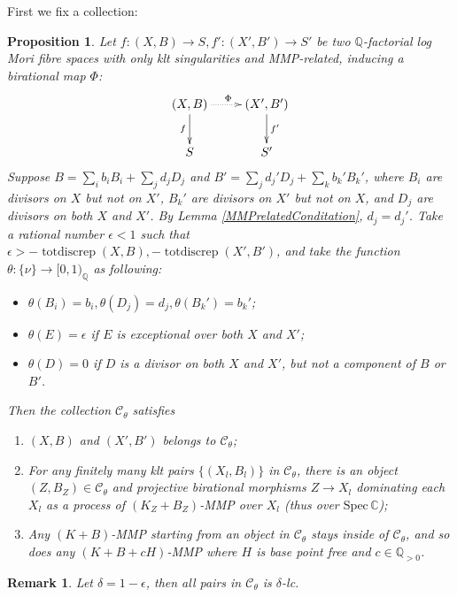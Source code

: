 \documentclass{article}
\newtheorem{prop}[defn]{Proposition}
\newtheorem{rmk}[defn]{Remark}
\begin{document}
First we fix a collection: 
\begin{prop}\label{cat}
  \cite[Lemma 3.6]{brunoLogSarkisovProgram1995}
  Let $ f:(X,B)\to S,f':(X',B')\to S' $ be two $ \mathbb{Q} $-factorial log Mori fibre spaces  with only klt singularities and MMP-related, inducing a birational map $\Phi$:
  \[ \xymatrix{
      (X,B)\ar[d]_f\ar@{.>}[r]^\Phi&(X',B')\ar[d]^{f'}\\
 S&S'} \]
 Suppose  $ B=\sum_ib_iB_i+\sum_jd_jD_j $ and $ B'=\sum_jd_j'D_j+\sum_kb_k'B_k' $, where $ B_i $ are divisors on $ X $ but not on $ X' $, $ B_k' $ are divisors on $ X' $ but not on $ X $, and $ D_j $ are divisors on both $ X $ and $ X' $. By Lemma \ref{MMPrelatedConditation}, $ d_j=d_j' $. Take a rational number $ \epsilon<1 $ such that $ \epsilon> -\operatorname{totdiscrep}(X,B),-\operatorname{totdiscrep}(X',B') $, and take the function $ \theta:\{\nu\}\to [0,1)_\mathbb{Q} $ as following:
  \begin{itemize}
    \item $ \theta(B_i)=b_i, \theta(D_j)=d_j,\theta(B_k')=b_k'$;
    \item $ \theta(E)=\epsilon $ if $ E $ is exceptional over both $ X $ and $ X' $;
    \item $ \theta(D)=0 $ if $ D $ is a divisor on both $ X $ and $ X' $, but not a component of $ B $ or $ B' $.
  \end{itemize}
  Then the collection $ \mathcal{C}_\theta $ satisfies
  \begin{enumerate}
    \item $ (X,B) $ and $ (X',B') $ belongs to $ \mathcal{C}_\theta $;
    \item For any finitely many klt pairs $ \{(X_l,B_l)\} $ in $ \mathcal{C}_\theta $, there is an object $ (Z,B_Z)\in \mathcal{C}_\theta $ and projective birational morphisms $ Z\to X_l $ dominating each  $ X_l $ as a process of $ (K_{Z}+B_{Z}) $-MMP over $ X_l $ (thus over $ \mathrm{Spec}\,\mathbb{C} $);
    \item Any $ (K+B) $-MMP starting from an object in $ \mathcal{C}_\theta $ stays inside of $ \mathcal{C}_\theta $, and so does any $ (K+B+cH) $-MMP where $ H $ is base point free and $ c\in \mathbb{Q}_{>0} $. 
  \end{enumerate}
\end{prop}
\begin{rmk}
Let $\delta=1-\epsilon$, then all pairs in $\mathcal{C}_{\theta}$ is $\delta$-lc. 
\end{rmk}
\end{document}
